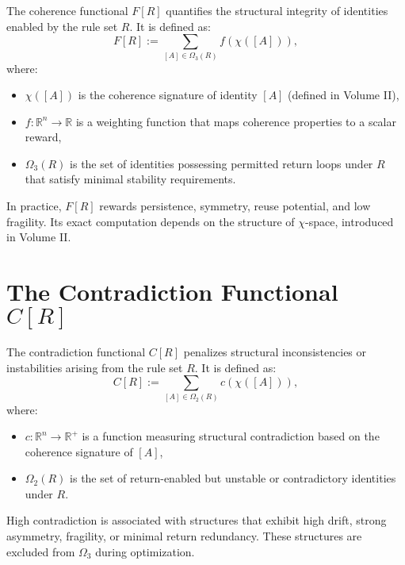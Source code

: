 \begin{definition}
The coherence functional $F[R]$ quantifies the structural integrity of identities enabled by the rule set $R$. It is defined as:
\begin{equation}
F[R] := \sum_{[A] \in \Omega_3(R)} f(\chi([A])),
\end{equation}
where:
\begin{itemize}
    \item $\chi([A])$ is the coherence signature of identity $[A]$ (defined in Volume II),
    \item $f: \mathbb{R}^n \to \mathbb{R}$ is a weighting function that maps coherence properties to a scalar reward,
    \item $\Omega_3(R)$ is the set of identities possessing permitted return loops under $R$ that satisfy minimal stability requirements.
\end{itemize}
\end{definition}

\noindent
In practice, $F[R]$ rewards persistence, symmetry, reuse potential, and low fragility. Its exact computation depends on the structure of $\chi$-space, introduced in Volume II.

\section{The Contradiction Functional $C[R]$}

\begin{definition}
The contradiction functional $C[R]$ penalizes structural inconsistencies or instabilities arising from the rule set $R$. It is defined as:
\begin{equation}
C[R] := \sum_{[A] \in \Omega_2(R)} c(\chi([A])),
\end{equation}
where:
\begin{itemize}
    \item $c: \mathbb{R}^n \to \mathbb{R}^+$ is a function measuring structural contradiction based on the coherence signature of $[A]$,
    \item $\Omega_2(R)$ is the set of return-enabled but unstable or contradictory identities under $R$.
\end{itemize}
\end{definition}

\noindent
High contradiction is associated with structures that exhibit high drift, strong asymmetry, fragility, or minimal return redundancy. These structures are excluded from $\Omega_3$ during optimization.

